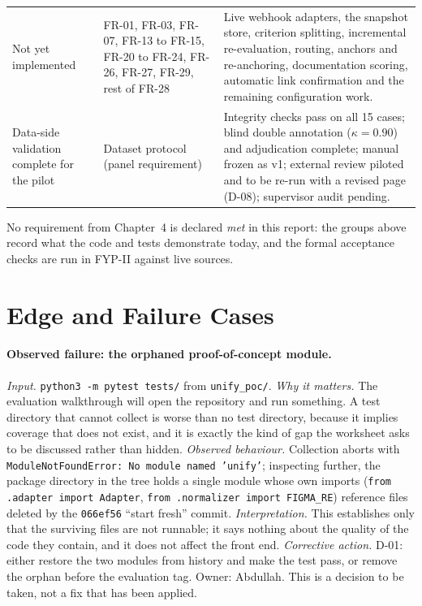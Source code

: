 \begin{longtable}{>{\raggedright\arraybackslash}p{} >{\raggedright\arraybackslash}p{} >{\raggedright\arraybackslash}p{}}
Not yet implemented
  & FR-01, FR-03, FR-07, FR-13 to FR-15, FR-20 to FR-24, FR-26, FR-27, FR-29,
    rest of FR-28
  & Live webhook adapters, the snapshot store, criterion splitting, incremental
    re-evaluation, routing, anchors and re-anchoring, documentation scoring,
    automatic link confirmation and the remaining configuration work. \\
Data-side validation complete for the pilot
  & Dataset protocol (panel requirement)
  & Integrity checks pass on all 15 cases; blind double annotation
    ($\kappa = 0.90$) and adjudication complete; manual frozen as v1; external
    review piloted and to be re-run with a revised page (D-08); supervisor
    audit pending. \\
\hline\end{longtable}

No requirement from Chapter~4 is declared \emph{met} in this report: the
groups above record what the code and tests demonstrate today, and the formal
acceptance checks are run in FYP-II against live sources.

\section{Edge and Failure Cases}
\label{sec:edge-cases}

\paragraph{Observed failure: the orphaned proof-of-concept module.}
\emph{Input.} \texttt{python3 -m pytest tests/\allowbreak{}} from \texttt{unify\_poc/}.
\emph{Why it matters.} The evaluation walkthrough will open the repository and
run something. A test directory that cannot collect is worse than no test
directory, because it implies coverage that does not exist, and it is exactly
the kind of gap the worksheet asks to be discussed rather than hidden.
\emph{Observed behaviour.} Collection aborts with
\texttt{ModuleNotFoundError: No module named 'unify'}; inspecting further, the
package directory in the tree holds a single module whose own imports
(\texttt{from .\allowbreak{}adapter import Adapter}, \texttt{from .\allowbreak{}normalizer import
FIGMA\_\allowbreak{}RE}) reference files deleted by the \texttt{066ef56} ``start fresh''
commit. \emph{Interpretation.} This establishes only that the surviving files
are not runnable; it says nothing about the quality of the code they contain,
and it does not affect the front end. \emph{Corrective action.} D-01: either
restore the two modules from history and make the test pass, or remove the
orphan before the evaluation tag. Owner: Abdullah. This is a decision to be
taken, not a fix that has been applied.

